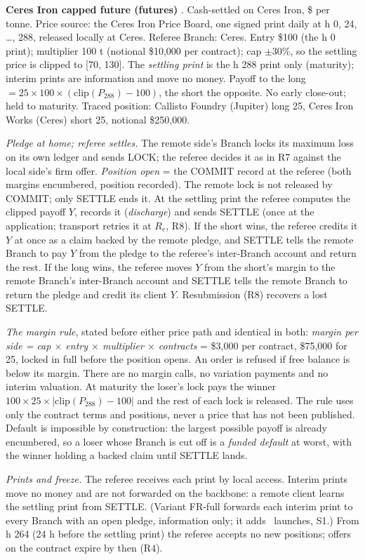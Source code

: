 \textbf{Ceres Iron capped future (futures)} \implemented. Cash-settled on Ceres Iron, \$ per tonne. Price source: the
Ceres Iron Price Board, one signed print daily at h 0, 24, \ldots, 288, released locally at Ceres. Referee Branch:
Ceres. Entry \$100 (the h 0 print); multiplier 100 t (notional \$10{,}000 per contract); cap $\pm30\%$, so the
settling price is clipped to [70, 130]. The \emph{settling print} is the h 288 print only (maturity); interim prints
are information and move no money. Payoff to the long $= 25 \times 100 \times (\mathrm{clip}(P_{288}) - 100)$, the
short the opposite. No early close-out; held to maturity. Traced position: Callisto Foundry (Jupiter) long 25,
Ceres Iron Works (Ceres) short 25, notional \$250{,}000.
\begin{description}[leftmargin=2.2em,style=sameline]
\item[R10] \emph{Pledge at home; referee settles.} The remote side's Branch locks its maximum loss on its own ledger
and sends LOCK; the referee decides it as in R7 against the local side's firm offer. \emph{Position open} = the COMMIT
record at the referee (both margins encumbered, position recorded). The remote lock is not released by COMMIT; only
SETTLE ends it. At the settling print the referee computes the clipped payoff $Y$, records it (\emph{discharge}) and
sends SETTLE (once at the application; transport retries it at $R_e$, R8). If the short wins, the referee credits it $Y$ at once as a claim backed by the remote pledge, and
SETTLE tells the remote Branch to pay $Y$ from the pledge to the referee's inter-Branch account and return the rest.
If the long wins, the referee moves $Y$ from the short's margin to the remote Branch's inter-Branch account and SETTLE
tells the remote Branch to return the pledge and credit its client $Y$. Resubmission (R8) recovers a lost SETTLE.
\item[R11] \emph{The margin rule}, stated before either price path and identical in both: \emph{margin per side =
cap $\times$ entry $\times$ multiplier $\times$ contracts} = \$3{,}000 per contract, \$75{,}000 for 25, locked in full
before the position opens. An order is refused if free balance is below its margin. There are no margin calls, no
variation payments and no interim valuation. At maturity the loser's lock pays the winner
$100 \times 25 \times |\mathrm{clip}(P_{288}) - 100|$ and the rest of each lock is released. The rule uses only the
contract terms and positions, never a price that has not been published. Default is impossible by construction: the
largest possible payoff is already encumbered, so a loser whose Branch is cut off is a \emph{funded default} at
worst, with the winner holding a backed claim until SETTLE lands.
\item[R12] \emph{Prints and freeze.} The referee receives each print by local access. Interim prints move no money and are not forwarded on the
backbone: a remote client learns the settling print from SETTLE. (Variant FR-full forwards each interim print to every Branch with an open pledge,
information only; it adds \SimFullExtra\ launches, S1.) From h 264 (24 h before the settling print) the referee accepts no new positions; offers on the
contract expire by then (R4).
\end{description}

